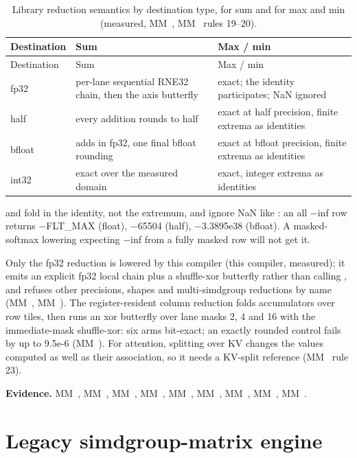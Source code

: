 \begin{xltabular}{\linewidth}{@{}lXX@{}}
\caption{Library reduction semantics by destination type, for sum and for max and min (measured, MM~, MM~ rules 19–20).}\label{tab:library-reductions}\\
\toprule
Destination & Sum & Max / min \\
\midrule
\endfirsthead
{}
\toprule
Destination & Sum & Max / min \\
\midrule
\endhead
fp32 & per-lane sequential RNE32 chain, then the axis butterfly & exact; the identity participates; NaN ignored \\*
half & every addition rounds to half & exact at half precision, finite extrema as identities \\*
bfloat & adds in fp32, one final bfloat rounding & exact at bfloat precision, finite extrema as identities \\*
int32 & exact over the measured domain & exact, integer extrema as identities \\*
\bottomrule
\end{xltabular}

 and  fold in the identity, not the extremum, and ignore NaN like : an all −inf row returns −FLT\_MAX
(float), −65504 (half), −3.3895e38 (bfloat). A masked-softmax lowering expecting −inf from a fully masked row will not
get it.

Only the fp32 reduction is lowered by this compiler (this compiler, measured); it emits an
explicit fp32 local chain plus a shuffle-xor butterfly rather than calling , and refuses other precisions,
shapes and multi-simdgroup reductions by name (MM~, MM~). The register-resident column reduction folds
accumulators over row tiles, then runs an xor butterfly over lane masks 2, 4 and 16 with the immediate-mask shuffle-xor: six arms bit-exact;
an exactly rounded control fails by up to 9.5e-6 (MM~). For attention, splitting over KV changes the
values computed as well as their association, so it needs a KV-split reference (MM~ rule 23).

\textbf{Evidence.} MM~, MM~, MM~, MM~, MM~, MM~, MM~, MM~, MM~.

\section{Legacy simdgroup-matrix engine}\label{sec:legacy-simdgroup-matrix-engine}

